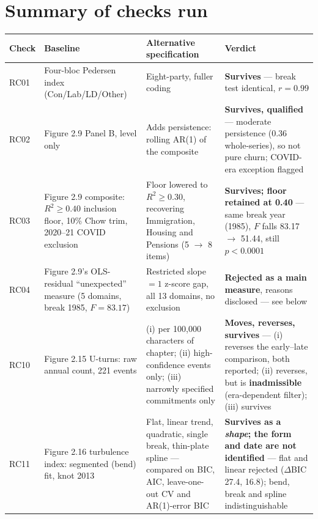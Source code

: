
\section{Summary of checks run}

\begin{threeparttable}
\caption{Robustness checks, Chapter Two}
\begin{tabular}{p{1.1cm} p{3.5cm} p{4.3cm} p{3.6cm}}
\toprule
Check & Baseline & Alternative specification & Verdict \\
\midrule
RC01 & Four-bloc Pedersen index (Con/Lab/LD/Other) & Eight-party, fuller coding & \textbf{Survives}
--- break test identical, $r=0.99$ \\
RC02 & Figure 2.9 Panel B, level only & Adds persistence: rolling AR(1) of the composite &
\textbf{Survives, qualified} --- moderate persistence (0.36 whole-series), so not pure churn;
COVID-era exception flagged \\
RC03 & Figure 2.9 composite: $R^2 \geq 0.40$ inclusion floor, 10\% Chow trim, 2020--21 COVID
exclusion & Floor lowered to $R^2 \geq 0.30$, recovering Immigration, Housing and Pensions
(5 $\rightarrow$ 8 items) & \textbf{Survives; floor retained at 0.40} --- same break year (1985),
$F$ falls 83.17 $\rightarrow$ 51.44, still $p<0.0001$ \\
RC04 & Figure 2.9's OLS-residual ``unexpected'' measure (5 domains, break 1985, $F=83.17$) &
Restricted slope\,$=1$ z-score gap, all 13 domains, no exclusion & \textbf{Rejected as a main
measure}, reasons disclosed --- see below \\
RC10 & Figure 2.15 U-turns: raw annual count, 221 events & (i) per 100,000 characters of chapter;
(ii) high-confidence events only; (iii) narrowly specified commitments only &
\textbf{Moves, reverses, survives} --- (i) reverses the early--late comparison, both reported;
(ii) reverses, but is \textbf{inadmissible} (era-dependent filter); (iii) survives \\
RC11 & Figure 2.16 turbulence index: segmented (bend) fit, knot 2013 & Flat, linear trend,
quadratic, single break, thin-plate spline --- compared on BIC, AIC, leave-one-out CV and
AR(1)-error BIC & \textbf{Survives as a \emph{shape}; the form and date are not identified} ---
flat and linear rejected ($\Delta$BIC 27.4, 16.8); bend, break and spline indistinguishable

\end{tabular}
\end{threeparttable}
